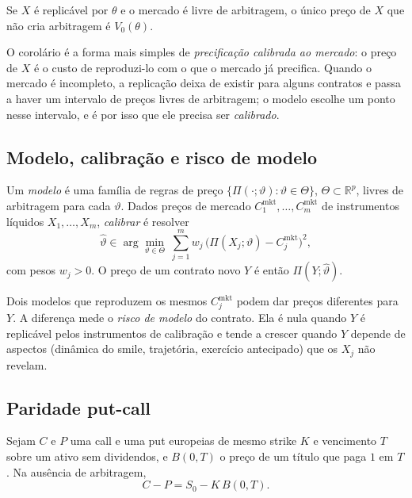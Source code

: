 \begin{corolario}
Se $X$ é replicável por $\theta$ e o mercado é livre de arbitragem, o único preço de $X$ que não cria arbitragem é $V_0(\theta)$.
\end{corolario}

O corolário é a forma mais simples de \emph{precificação calibrada ao mercado}: o preço de $X$ é o custo de reproduzi-lo com o que o mercado já precifica. Quando o mercado é incompleto, a replicação deixa de existir para alguns contratos e passa a haver um intervalo de preços livres de arbitragem; o modelo escolhe um ponto nesse intervalo, e é por isso que ele precisa ser \emph{calibrado}.

\subsection{Modelo, calibração e risco de modelo}

\begin{definicao}
Um \emph{modelo} é uma família de regras de preço $\{\Pi(\cdot;\vartheta):\vartheta\in\Theta\}$, $\Theta\subset\mathbb R^p$, livres de arbitragem para cada $\vartheta$. Dados preços de mercado $C^{\mathrm{mkt}}_1,\dots,C^{\mathrm{mkt}}_m$ de instrumentos líquidos $X_1,\dots,X_m$, \emph{calibrar} é resolver
\begin{equation}
\hat\vartheta\in\arg\min_{\vartheta\in\Theta}\ \sum_{j=1}^m w_j\,\big(\Pi(X_j;\vartheta)-C^{\mathrm{mkt}}_j\big)^2,
\end{equation}
com pesos $w_j>0$. O preço de um contrato novo $Y$ é então $\Pi(Y;\hat\vartheta)$.
\end{definicao}

\begin{observacao}
Dois modelos que reproduzem os mesmos $C^{\mathrm{mkt}}_j$ podem dar preços diferentes para $Y$. A diferença mede o \emph{risco de modelo} do contrato. Ela é nula quando $Y$ é replicável pelos instrumentos de calibração e tende a crescer quando $Y$ depende de aspectos (dinâmica do smile, trajetória, exercício antecipado) que os $X_j$ não revelam.
\end{observacao}

\subsection{Paridade put-call}

\begin{proposicao}
Sejam $C$ e $P$ uma call e uma put europeias de mesmo strike $K$ e vencimento $T$ sobre um ativo sem dividendos, e $B(0,T)$ o preço de um título que paga $1$ em $T$. Na ausência de arbitragem,
\begin{equation}
C-P=S_0-K\,B(0,T).
\end{equation}
\end{proposicao}

